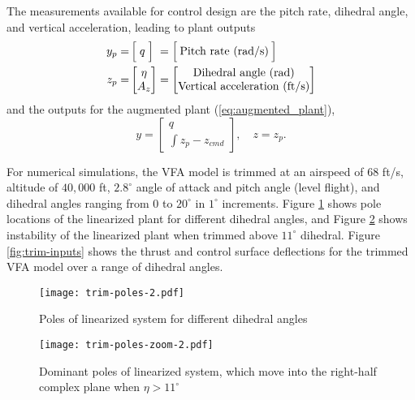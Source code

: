 The measurements available for control design are the pitch rate, dihedral angle, and vertical acceleration, leading to plant outputs
\begin{equation}
\begin{aligned}
y_p =& \, \Big[\; q \; \Big] \;= \Big[\: \text{Pitch rate (rad/s)} \:\Big] \\
z_p =& \begin{bmatrix}
\eta \\
A_z
\end{bmatrix} =\begin{bmatrix}
	$Dihedral angle (rad)$\\
	$Vertical acceleration (ft/s)$
\end{bmatrix}		
\end{aligned}
\end{equation}
and the outputs for the augmented plant (\ref{eq:augmented_plant}),
\begin{equation}
y = \begin{bmatrix}
	q \\ \int{z_p - z_{cmd}}
\end{bmatrix}, \quad z = z_p.
\end{equation}

For numerical simulations, the VFA model is trimmed at an airspeed of $68$ ft/s, altitude of $40,000$ ft, $2.8^\circ$ angle of attack and pitch angle (level flight), and dihedral angles ranging from $0$ to $20^\circ$ in $1^\circ$ increments. Figure \ref{fig:trim-poles} shows pole locations of the linearized plant for different dihedral angles, and Figure \ref{fig:trim-poles-zoom} shows instability of the linearized plant when trimmed above $11^\circ$ dihedral. Figure \ref{fig:trim-inputs} shows the thrust and control surface deflections for the trimmed VFA model over a range of dihedral angles.

\begin{figure}[htbp]
	\centering
	\texttt{[image: trim-poles-2.pdf]}
	\caption{Poles of linearized system for different dihedral angles}
	\label{fig:trim-poles}
\end{figure}

\begin{figure}[htbp]
	\centering
	\texttt{[image: trim-poles-zoom-2.pdf]}
	\caption{Dominant poles of linearized system, which move into the right-half complex plane when $\eta > 11^\circ$}
	\label{fig:trim-poles-zoom}
\end{figure}

